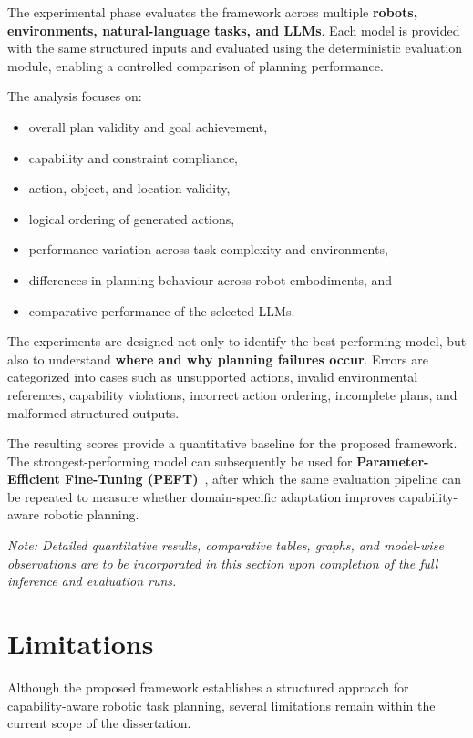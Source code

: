 \documentclass[12pt,a4paper]{article}
\begin{document}
The experimental phase evaluates the framework across multiple \textbf{robots, environments, natural-language tasks, and LLMs}.
Each model is provided with the same structured inputs and evaluated using the deterministic evaluation module, enabling a controlled comparison of planning performance.

The analysis focuses on:

\begin{itemize}
  \item overall plan validity and goal achievement,
  \item capability and constraint compliance,
  \item action, object, and location validity,
  \item logical ordering of generated actions,
  \item performance variation across task complexity and environments,
  \item differences in planning behaviour across robot embodiments, and
  \item comparative performance of the selected LLMs.
\end{itemize}

The experiments are designed not only to identify the best-performing model, but also to understand \textbf{where and why planning failures occur}.
Errors are categorized into cases such as unsupported actions, invalid environmental references, capability violations, incorrect action ordering, incomplete plans, and malformed structured outputs.

The resulting scores provide a quantitative baseline for the proposed framework.
The strongest-performing model can subsequently be used for \textbf{Parameter-Efficient Fine-Tuning (PEFT)}~\cite{peft}, after which the same evaluation pipeline can be repeated to measure whether domain-specific adaptation improves capability-aware robotic planning.

\textit{Note: Detailed quantitative results, comparative tables, graphs, and model-wise observations are to be incorporated in this section upon completion of the full inference and evaluation runs.}

\section{Limitations}

Although the proposed framework establishes a structured approach for capability-aware robotic task planning, several limitations remain within the current scope of the dissertation.
\end{document}

